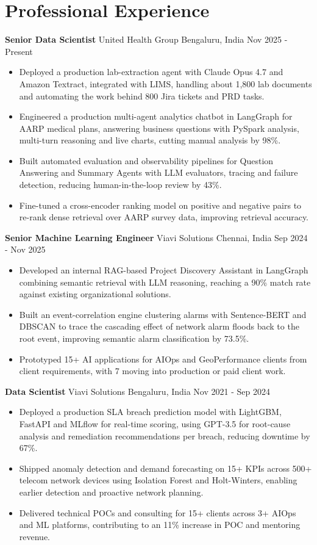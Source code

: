 \documentclass[10pt,a4paper]{article}
\newcommand{\role}[4]{\textbf{#1} \textbar{} #2 \hfill #3 \textbar{} #4\par}
\begin{document}
\section{Professional Experience}
\role{Senior Data Scientist}{United Health Group}{Bengaluru, India}{Nov 2025 - Present}
\begin{itemize}
  \item Deployed a production lab-extraction agent with Claude Opus 4.7 and Amazon Textract, integrated with LIMS, handling about 1,800 lab documents and automating the work behind 800 Jira tickets and PRD tasks.
  \item Engineered a production multi-agent analytics chatbot in LangGraph for AARP medical plans, answering business questions with PySpark analysis, multi-turn reasoning and live charts, cutting manual analysis by 98\%.
  \item Built automated evaluation and observability pipelines for Question Answering and Summary Agents with LLM evaluators, tracing and failure detection, reducing human-in-the-loop review by 43\%.
  \item Fine-tuned a cross-encoder ranking model on positive and negative pairs to re-rank dense retrieval over AARP survey data, improving retrieval accuracy.
\end{itemize}
\vspace{3pt}
\role{Senior Machine Learning Engineer}{Viavi Solutions}{Chennai, India}{Sep 2024 - Nov 2025}
\begin{itemize}
  \item Developed an internal RAG-based Project Discovery Assistant in LangGraph combining semantic retrieval with LLM reasoning, reaching a 90\% match rate against existing organizational solutions.
  \item Built an event-correlation engine clustering alarms with Sentence-BERT and DBSCAN to trace the cascading effect of network alarm floods back to the root event, improving semantic alarm classification by 73.5\%.
  \item Prototyped 15+ AI applications for AIOps and GeoPerformance clients from client requirements, with 7 moving into production or paid client work.
\end{itemize}
\vspace{3pt}
\role{Data Scientist}{Viavi Solutions}{Bengaluru, India}{Nov 2021 - Sep 2024}
\begin{itemize}
  \item Deployed a production SLA breach prediction model with LightGBM, FastAPI and MLflow for real-time scoring, using GPT-3.5 for root-cause analysis and remediation recommendations per breach, reducing downtime by 67\%.
  \item Shipped anomaly detection and demand forecasting on 15+ KPIs across 500+ telecom network devices using Isolation Forest and Holt-Winters, enabling earlier detection and proactive network planning.
  \item Delivered technical POCs and consulting for 15+ clients across 3+ AIOps and ML platforms, contributing to an 11\% increase in POC and mentoring revenue.
\end{itemize}
\end{document}
